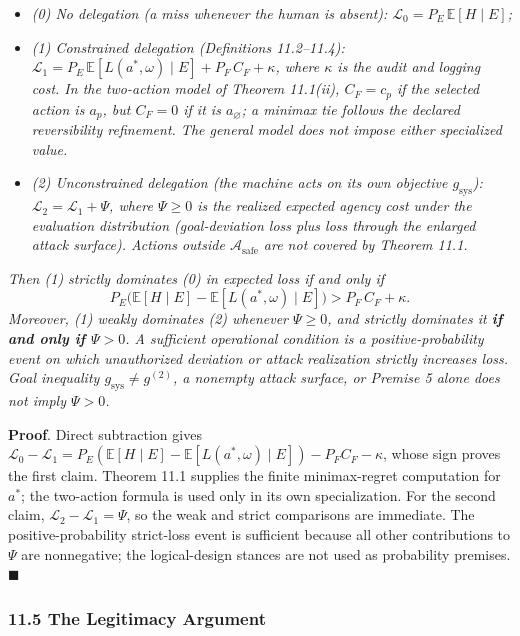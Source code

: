 \documentclass[
  11pt]{article}
\providecommand{\tightlist}{%
  \setlength{\itemsep}{0pt}\setlength{\parskip}{0pt}}
\begin{document}
\begin{itemize}
\tightlist
\item
  \emph{(0) No delegation (a miss whenever the human is absent):
  \(\mathcal{L}_0 = P_E\,\mathbb{E}[H\mid E]\);}
\item
  \emph{(1) Constrained delegation (Definitions 11.2--11.4):
  \(\mathcal{L}_1 = P_E\,\mathbb{E}[L(a^*,\omega)\mid E] + P_F\,C_F + \kappa\),
  where \(\kappa\) is the audit and logging cost. In the two-action
  model of Theorem 11.1(ii), \(C_F=c_p\) if the selected action is
  \(a_p\), but \(C_F=0\) if it is \(a_\varnothing\); a minimax tie
  follows the declared reversibility refinement. The general model does
  not impose either specialized value.}
\item
  \emph{(2) Unconstrained delegation (the machine acts on its own
  objective \(g_{\mathrm{sys}}\)):
  \(\mathcal{L}_2 = \mathcal{L}_1 + \Psi\), where \(\Psi \ge 0\) is the
  realized expected agency cost under the evaluation distribution
  (goal-deviation loss plus loss through the enlarged attack surface).
  Actions outside \(\mathcal{A}_{\mathrm{safe}}\) are not covered by
  Theorem 11.1.}
\end{itemize}

\emph{Then (1) strictly dominates (0) in expected loss if and only if}
\[P_E\big(\mathbb{E}[H\mid E] - \mathbb{E}[L(a^*,\omega)\mid E]\big) > P_F\,C_F + \kappa.\]
\emph{Moreover, (1) weakly dominates (2) whenever \(\Psi\ge0\), and
strictly dominates it \textbf{if and only if \(\Psi>0\)}. A sufficient
operational condition is a positive-probability event on which
unauthorized deviation or attack realization strictly increases loss.
Goal inequality \(g_{\mathrm{sys}}\ne g^{(2)}\), a nonempty attack
surface, or Premise 5 alone does not imply \(\Psi>0\).}

\textbf{Proof}. Direct subtraction gives
\(\mathcal{L}_0 - \mathcal{L}_1 = P_E(\mathbb{E}[H\mid E] - \mathbb{E}[L(a^*,\omega)\mid E]) - P_F C_F - \kappa\),
whose sign proves the first claim. Theorem 11.1 supplies the finite
minimax-regret computation for \(a^*\); the two-action formula is used
only in its own specialization. For the second claim,
\(\mathcal{L}_2-\mathcal{L}_1=\Psi\), so the weak and strict comparisons
are immediate. The positive-probability strict-loss event is sufficient
because all other contributions to \(\Psi\) are nonnegative; the
logical-design stances are not used as probability premises.
\(\blacksquare\)

\subsubsection{11.5 The Legitimacy
Argument}\label{the-legitimacy-argument}
\end{document}
